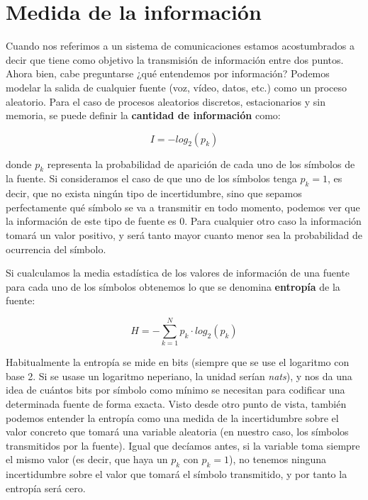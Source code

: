 \documentclass[es,apuntes]{uah}
\begin{document}

\maketitle


\section{Medida de la información}

Cuando nos referimos a un sistema de comunicaciones estamos acostumbrados a decir que tiene como objetivo la transmisión de información entre dos puntos. Ahora bien, cabe preguntarse ¿qué entendemos por información? 
Podemos modelar la salida de cualquier fuente (voz, vídeo, datos, etc.) como un proceso aleatorio. Para el caso de procesos aleatorios discretos, estacionarios y sin memoria, se puede definir la {\bf cantidad de información} como:

\begin{displaymath}
	I = -log_2(p_k)
\end{displaymath}

donde $p_k$ representa la probabilidad de aparición de cada uno de los símbolos de la fuente. Si consideramos el caso de que uno de los símbolos tenga $p_k=1$, es decir, que no exista ningún tipo de incertidumbre, sino que sepamos perfectamente qué símbolo se va a transmitir en todo momento, podemos ver que la información de este tipo de fuente es $0$. Para cualquier otro caso la información tomará un valor positivo, y será tanto mayor cuanto menor sea la probabilidad de ocurrencia del símbolo.

Si cualculamos la media estadística de los valores de información de una fuente para cada uno de los símbolos obtenemos lo que se denomina {\bf entropía} de la fuente:

\begin{equation}
	H = - \sum_{k=1}^{N}p_k \cdot  log_2(p_k)
\end{equation}

Habitualmente la entropía se mide en bits (siempre que se use el logaritmo con base 2. Si se usase un logaritmo neperiano, la unidad serían \emph{nats}), y nos da una idea de cuántos bits por símbolo como mínimo se necesitan para codificar una determinada fuente de forma exacta. Visto desde otro punto de vista, también podemos entender la entropía como una medida de la incertidumbre sobre el valor concreto que tomará una variable aleatoria (en nuestro caso, los símbolos transmitidos por la fuente). Igual que decíamos antes, si la variable toma siempre el mismo valor (es decir, que haya un $p_k$ con $p_k=1$), no tenemos ninguna incertidumbre sobre el valor que tomará el símbolo transmitido, y por tanto la entropía será cero.
\end{document}

